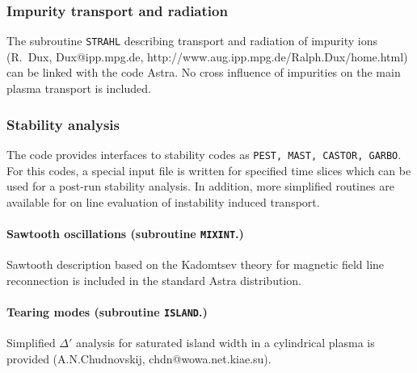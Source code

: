 \subsubsection{Impurity transport and radiation}
The subroutine {\tt STRAHL} \cite{strahl} describing transport and
radiation of impurity ions (R.~Dux, Dux@ipp.mpg.de,
http://www.aug.ipp.mpg.de/Ralph.Dux/home.html) 
can be linked with the code Astra. 
No cross influence of impurities on the main plasma transport is
included. 


\subsubsection{Stability analysis}

The code provides interfaces to stability codes as {\tt PEST,
MAST, CASTOR, GARBO}. 
For this codes, a special input file is written for specified time
slices which can be used for a post-run stability analysis.
In addition, more simplified routines are available for on line
evaluation of instability induced transport. 

\paragraph{Sawtooth oscillations ({\rm subroutine \tt MIXINT}.)} 
Sawtooth description \cite{PP} based on the Ka\-domtsev theory for
magnetic field line reconnection \cite{BB,PP} is included in the standard
Astra distribution. 

\paragraph{Tearing modes ({\rm subroutine \tt ISLAND}.)} 
Simplified $\Delta'$ analysis for saturated island width in a
cylindrical plasma is provided (A.N.Chudnovskij, chdn@wowa.net.kiae.su). 


\vfill\eject
